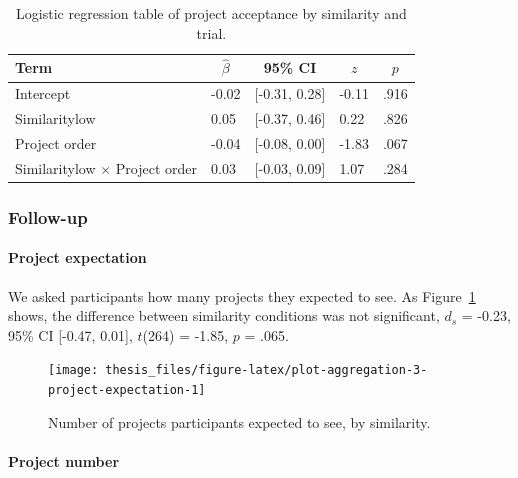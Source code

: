 \documentclass[a4paper, nobind, dvipsnames]{templates/ociamthesis}
\theoremstyle{definition}
\theoremstyle{definition}
\theoremstyle{definition}
\theoremstyle{definition}
\theoremstyle{remark}
\begin{document}
\begin{table}[tbp]

\begin{center}
\begin{threeparttable}

\caption{\label{tab:similarity-project-order}Logistic regression table of project acceptance by similarity and trial.}

\begin{tabular}{lllll}
\toprule
Term & \multicolumn{1}{c}{$\hat{\beta}$} & \multicolumn{1}{c}{95\% CI} & \multicolumn{1}{c}{$z$} & \multicolumn{1}{c}{$p$}\\
\midrule
Intercept & -0.02 & {}[-0.31, 0.28] & -0.11 & .916\\
Similaritylow & 0.05 & {}[-0.37, 0.46] & 0.22 & .826\\
Project order & -0.04 & {}[-0.08, 0.00] & -1.83 & .067\\
Similaritylow $\times$ Project order & 0.03 & {}[-0.03, 0.09] & 1.07 & .284\\
\bottomrule
\end{tabular}

\end{threeparttable}
\end{center}

\end{table}

\subsubsection{Follow-up}

\paragraph{Project expectation}

We asked participants how many projects they expected to see. As
Figure~\ref{fig:plot-aggregation-3-project-expectation} shows, the difference
between similarity conditions was not significant,
\(d_s\) = -0.23, 95\% CI {[}-0.47, 0.01{]}, \(t\)(264) = -1.85, \(p\) = .065.



\begin{figure}
\texttt{[image: thesis\_files/figure-latex/plot-aggregation-3-project-expectation-1]} \caption{Number of projects participants expected to see, by similarity.}\label{fig:plot-aggregation-3-project-expectation}
\end{figure}

\paragraph{Project number}
\end{document}
